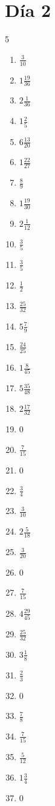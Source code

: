 \documentclass[12pt]{article}
\begin{document}
\section*{Día 2}
\begin{multicols}{5}\begin{enumerate}
\item $ \frac{3}{10} $
\item $ 1 \frac{19}{36} $
\item $ 2 \frac{1}{36} $
\item $ 1 \frac{2}{5} $
\item $ 6 \frac{13}{20} $
\item $ 1 \frac{22}{27} $
\item $ \frac{8}{9} $
\item $ 1 \frac{19}{30} $
\item $ 2 \frac{1}{12} $
\item $ \frac{3}{5} $
\item $ \frac{3}{5} $
\item $ \frac{1}{2} $
\item $ \frac{25}{32} $
\item $ 5 \frac{7}{9} $
\item $ \frac{24}{25} $
\item $ 1 \frac{8}{45} $
\item $ 5 \frac{35}{48} $
\item $ 2 \frac{17}{32} $
\item $ 0 $
\item $ \frac{7}{15} $
\item $ 0 $
\item $ \frac{3}{4} $
\item $ \frac{3}{10} $
\item $ 2 \frac{5}{18} $
\item $ \frac{3}{20} $
\item $ 0 $
\item $ \frac{7}{15} $
\item $ 4 \frac{29}{45} $
\item $ \frac{25}{32} $
\item $ 3 \frac{1}{8} $
\item $ \frac{2}{3} $
\item $ 0 $
\item $ \frac{7}{8} $
\item $ \frac{7}{15} $
\item $ \frac{5}{12} $
\item $ 1 \frac{3}{4} $
\item $ 0 $

\end{enumerate}
\end{multicols}
\end{document}
